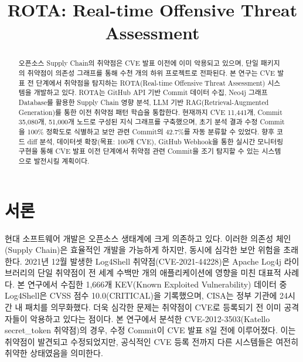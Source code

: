 ﻿\documentclass[conference]{IEEEtran}
\begin{document}
\sloppy
\setlength{\parskip}{0.3em}
\setlength{\parindent}{1em}

\renewcommand{\thesubsection}{\arabic{subsection}}

\title{ROTA: Real-time Offensive Threat Assessment}

\author{
}

\maketitle

\pagestyle{plain}
\thispagestyle{plain}

\begin{abstract}
오픈소스 Supply Chain의 취약점은 CVE 발표 이전에 이미 악용되고 있으며, 단일 패키지의 취약점이 의존성 그래프를 통해 수천 개의 하위 프로젝트로 전파된다. 본 연구는 CVE 발표 전 단계에서 취약점을 탐지하는 ROTA(Real-time Offensive Threat Assessment) 시스템을 개발하고 있다. ROTA는 GitHub API 기반 Commit 데이터 수집, Neo4j 그래프 Database를 활용한 Supply Chain 영향 분석, LLM 기반 RAG(Retrieval-Augmented Generation)를 통한 이전 취약점 패턴 학습을 통합한다. 현재까지 CVE 11,441개, Commit 35,080개, 51,000개 노드로 구성된 지식 그래프를 구축했으며, 초기 분석 결과 수정 Commit을 100\% 정확도로 식별하고 보안 관련 Commit의 42.7\%를 자동 분류할 수 있었다. 향후 코드 diff 분석, 데이터셋 확장(목표: 100개 CVE), GitHub Webhook을 통한 실시간 모니터링 구현을 통해 CVE 발표 이전 단계에서 취약점 관련 Commit을 조기 탐지할 수 있는 시스템으로 발전시킬 계획이다.
\end{abstract}

\section{서론}

\indent 현대 소프트웨어 개발은 오픈소스 생태계에 크게 의존하고 있다. 이러한 의존성 체인(Supply Chain)은 효율적인 개발을 가능하게 하지만, 동시에 심각한 보안 위험을 초래한다. 2021년 12월 발생한 Log4Shell 취약점(CVE-2021-44228)은 Apache Log4j 라이브러리의 단일 취약점이 전 세계 수백만 개의 애플리케이션에 영향을 미친 대표적 사례다. 본 연구에서 수집한 1,666개 KEV(Known Exploited Vulnerability) 데이터 중 Log4Shell은 CVSS 점수 10.0(CRITICAL)을 기록했으며, CISA는 정부 기관에 24시간 내 패치를 의무화했다. 더욱 심각한 문제는 취약점이 CVE로 등록되기 전 이미 공격자들이 악용하고 있다는 점이다. 본 연구에서 분석한 CVE-2012-3503(Katello secret\_token 취약점)의 경우, 수정 Commit이 CVE 발표 8일 전에 이루어졌다. 이는 취약점이 발견되고 수정되었지만, 공식적인 CVE 등록 전까지 다른 시스템들은 여전히 취약한 상태였음을 의미한다.
\end{document}
